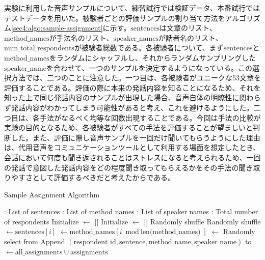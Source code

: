 \documentclass[12pt]{jarticle}
\numberwithin{equation}{section}    %
\numberwithin{figure}{section}      %
\numberwithin{table}{section}      %
\begin{document}
実験に利用した音声サンプルについて、練習試行では検証データ、本番試行ではテストデータを用いた。被験者ごとの評価サンプルの割り当て方法をアルゴリズム\ref{sec4:algo:sample-assignment}に示す。$\text{sentences}$は文章のリスト、$\text{method\_names}$が手法名のリスト、$\text{speaker\_names}$が話者名のリスト、$\text{num\_total\_respondents}$が被験者総数である。各被験者について、まず$\text{sentences}$と$\text{method\_names}$をランダムにシャッフルし、それからランダムサンプリングした$\text{speaker\_name}$を合わせて、一つのサンプルを決定するようになっている。この選択方法では、二つのことに注意した。一つ目は、各被験者がユニークな53文章を評価することである。評価の際に本来の発話内容を知ることになるため、それを知った上で同じ発話内容のサンプルが出現した場合、音声自体の明瞭性に関わらず発話内容がわかってしまう可能性があると考え、これを避けるようにした。二つ目は、各手法がなるべく均等な回数出現することである。今回は手法の比較が実験の目的となるため、各被験者がすべての手法を評価することが望ましいと判断した。また、評価に際し音声サンプルを一回だけ聞いてもらうようにした理由は、代用音声をコミュニケーションツールとして利用する場面を想定したとき、会話において何度も聞き返されることはストレスになると考えられるため、一回の発話で意図した発話内容をどの程度聞き取ってもらえるかをその手法の聞き取りやすさとして評価するべきだと考えたからである。
\begin{algorithm}
    \caption{Sample Assignment Algorithm}
    \label{sec4:algo:sample-assignment}
    \begin{algorithmic}[1]
        \Require {}: List of sentences
        \Require {}: List of method names
        \Require {}: List of speaker names
        \Require {}: Total number of respondents
        \State Initialize  $\gets$ []
        \State Initialize  $\gets$ []
        \State Randomly shuffle 
        \State Randomly shuffle 
        \State {} $\gets \text{sentences}[i]$
        \State {} $\gets \text{method\_names}[i \bmod \text{len(method\_names)}]$
        \State {} $\gets$ Randomly select from 
        \State Append $(\text{respondent\_id}, \text{sentence}, \text{method\_name}, \text{speaker\_name})$ to 
        \EndFor
        \State {} $\gets \text{all\_assignments} \cup \text{assignments}$
        \EndFor
        \State \Return {}
    \end{algorithmic}
\end{algorithm}
\end{document}
